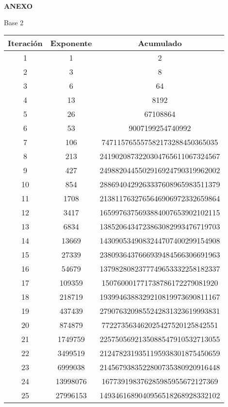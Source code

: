 \documentclass[fleqn]{article}
\begin{document}
    \newpage
    \textbf{\Large{ANEXO}} \\
    \begin{center}
        Base 2
        \begin{tabular}{c | c | c}
            Iteración & Exponente & Acumulado \\ \hline
            1 & 1 & 2 \\
            2 & 3 & 8 \\
            3 & 6 & 64 \\
            4 & 13 & 8192 \\
            5 & 26 & 67108864 \\
            6 & 53 & 9007199254740992 \\
            7 & 106 & 747115765557582173288450365035 \\
            8 & 213 & 2419020873220304765611067324567 \\
            9 & 427 & 2498820445502916924790319962002 \\
            10 & 854 & 2886940429263337608965983511379 \\
            11 & 1708 & 2138117632765646906972332659864 \\
            12 & 3417 & 1659976375693884007653902102115 \\
            13 & 6834 & 1385206434723863082993476719703 \\
            14 & 13669 & 1430905349083244707400299154908 \\
            15 & 27339 & 2380936437666939484566306691963 \\
            16 & 54679 & 1379828082377749653332258182337 \\
            17 & 109359 & 150760001771738786172279081920 \\
            18 & 218719 & 1939946388329210819973690811167 \\
            19 & 437439 & 2790763209855242831323619993831 \\
            20 & 874879 & 772273563462025427520125842551 \\
            21 & 1749759 & 2257505692135088547910532713055 \\
            22 & 3499519 & 2124782319351195938301875450659 \\
            23 & 6999038 & 2145679383522800735380920916448 \\
            24 & 13998076 & 167739198376285985955672127369 \\
            25 & 27996153 & 1493461689040956518268928332102 \\

\end{tabular}
\end{center}
\end{document}
